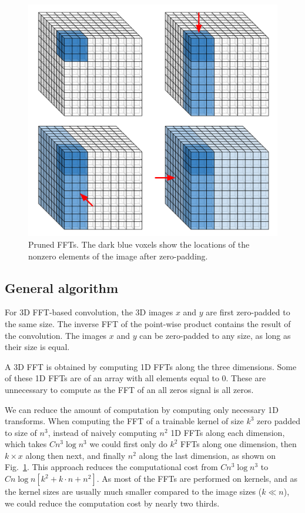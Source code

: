 \documentclass[conference]{./IEEEtran/IEEEtran}
\begin{document}
  \begin{figure}
    \begin{center}
      \includegraphics[width=0.49\columnwidth]{fig/pruned_ffts.pdf}
    \end{center}
    \caption{Pruned FFTs. The dark blue voxels show the locations of
      the nonzero elements of the image after zero-padding. }
    \label{fig:pruned_ffts}
  \end{figure}

  \subsection{General algorithm}

  For 3D FFT-based convolution, the 3D images $x$ and $y$ are first
  zero-padded to the same size.  The inverse FFT of the point-wise
  product contains the result of the convolution.  The images $x$ and
  $y$ can be zero-padded to any size, as long as their size is equal.

  A 3D FFT is obtained by computing 1D FFTs along the three
  dimensions.  Some of these 1D FFTs are of an array with all elements
  equal to $0$.  These are unnecessary to compute as the FFT of
  an all zeros signal is all zeros.

  We can reduce the amount of computation by computing only necessary
  1D transforms.  When computing the FFT of a trainable kernel of size
  $k^3$ zero padded to size of $n^3$, instead of naively computing
  $n^2$ 1D FFTs along each dimension, which takes $C n^3 \log n^3$ we
  could first only do $k^2$ FFTs along one dimension, then $k \times
  x$ along then next, and finally $n^2$ along the last dimension, as
  shown on Fig.~\ref{fig:pruned_ffts}.  This approach reduces the
  computational cost from $C n^3 \log n^3$ to $C n\log n[k^2 + k \cdot
    n + n^2]$.  As most of the FFTs are performed on kernels, and as
  the kernel sizes are usually much smaller compared to the image
  sizes ($k \ll n$), we could reduce the computation cost by nearly
  two thirds.
\end{document}
